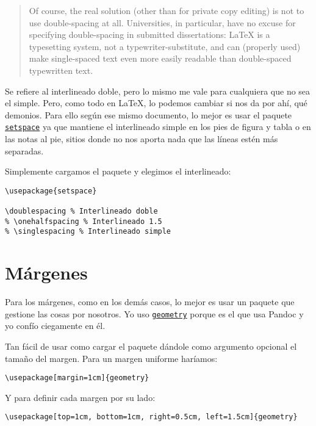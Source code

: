 \begin{quote}
Of course, the real solution (other than for private copy editing) is
not to use double-spacing at all. Universities, in particular, have no
excuse for specifying double-spacing in submitted dissertations: LaTeX
is a typesetting system, not a typewriter-substitute, and can (properly
used) make single-spaced text even more easily readable than
double-spaced typewritten text.
\end{quote}

Se refiere al interlineado doble, pero lo mismo me vale para cualquiera
que no sea el simple. Pero, como todo en LaTeX, lo podemos cambiar si
nos da por ahí, qué demonios. Para ello según ese mismo documento, lo
mejor es usar el paquete
\href{https://www.ctan.org/pkg/setspace}{\lstinline!setspace!} ya que
mantiene el interlineado simple en los pies de figura y tabla o en las
notas al pie, sitios donde no nos aporta nada que las líneas estén más
separadas.

Simplemente cargamos el paquete y elegimos el interlineado:

\begin{lstlisting}[language={[latex]tex}]
% Preámbulo
\usepackage{setspace}

\doublespacing % Interlineado doble
% \onehalfspacing % Interlineado 1.5
% \singlespacing % Interlineado simple
\end{lstlisting}

\section{Márgenes}\label{sec:margenes}

Para los márgenes, como en los demás casos, lo mejor es usar un paquete
que gestione las cosas por nosotros. Yo uso
\href{http://ctan.org/pkg/geometry}{\lstinline!geometry!} porque es el
que usa Pandoc y yo confío ciegamente en él.

Tan fácil de usar como cargar el paquete dándole como argumento opcional
el tamaño del margen. Para un margen uniforme haríamos:

\begin{lstlisting}[language={[latex]tex}]
\usepackage[margin=1cm]{geometry}
\end{lstlisting}

Y para definir cada margen por su lado:

\begin{lstlisting}
\usepackage[top=1cm, bottom=1cm, right=0.5cm, left=1.5cm]{geometry}
\end{lstlisting}

